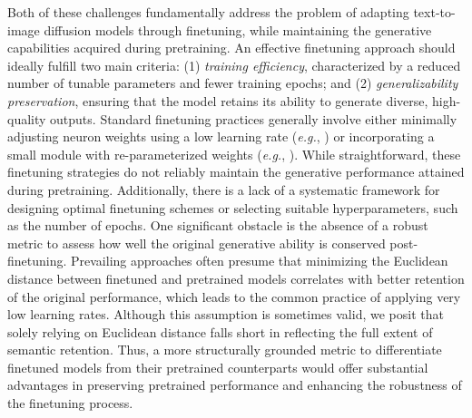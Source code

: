 Both of these challenges fundamentally address the problem of adapting text-to-image diffusion models through finetuning, while maintaining the generative capabilities acquired during pretraining. An effective finetuning approach should ideally fulfill two main criteria: (1) \emph{training efficiency}, characterized by a reduced number of tunable parameters and fewer training epochs; and (2) \emph{generalizability preservation}, ensuring that the model retains its ability to generate diverse, high-quality outputs. Standard finetuning practices generally involve either minimally adjusting neuron weights using a low learning rate (\emph{e.g.}, \cite{ruiz2023dreambooth}) or incorporating a small module with re-parameterized weights (\emph{e.g.}, \cite{hulora2022,zhang2023adding}). While straightforward, these finetuning strategies do not reliably maintain the generative performance attained during pretraining. Additionally, there is a lack of a systematic framework for designing optimal finetuning schemes or selecting suitable hyperparameters, such as the number of epochs. One significant obstacle is the absence of a robust metric to assess how well the original generative ability is conserved post-finetuning. Prevailing approaches often presume that minimizing the Euclidean distance between finetuned and pretrained models correlates with better retention of the original performance, which leads to the common practice of applying very low learning rates. Although this assumption is sometimes valid, we posit that solely relying on Euclidean distance falls short in reflecting the full extent of semantic retention. Thus, a more structurally grounded metric to differentiate finetuned models from their pretrained counterparts would offer substantial advantages in preserving pretrained performance and enhancing the robustness of the finetuning process.

